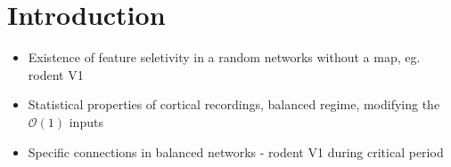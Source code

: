 \section{\label{sec:level1}Introduction}
\begin{itemize}
   \item Existence of feature seletivity in a random networks without a map, eg. rodent V1  
   \item Statistical properties of cortical recordings, balanced regime, modifying the $\mathcal{O}(1)$ inputs
   \item  Specific connections in balanced networks - rodent V1 during critical period
\end{itemize}